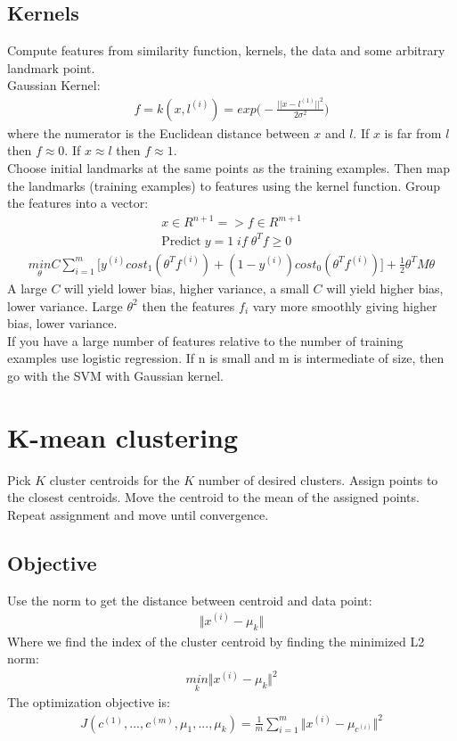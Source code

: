 \documentclass[12pt]{article}
\begin{document}
\begin{&itemize}
\subsection{Kernels}
Compute features from similarity function, kernels, the data and some arbitrary landmark point. \\

Gaussian Kernel:
\begin{align*}
	f = k(x, l^{(i)})=exp\bigg(-\frac{||x-l^{(1)}||^2}{2\sigma^2}\bigg)
\end{align*}
where the numerator is the Euclidean distance between $x$ and $l$. If $x$ is far from $l$ then $f\approx 0$.  If $x\approx l$ then $f\approx 1$. \\ 

Choose initial landmarks at the same points as the training examples. Then map the landmarks (training examples) to features using the kernel function. Group the features into a vector:
\begin{align*}
	x\in R^{n+1} => f\in R^{m+1} \\
	\text{Predict}\; y=1\; if\; \theta^Tf\ge 0
\end{align*} 
\begin{align*}
\underset{\theta}{min}C\sum_{i=1}^{m}\bigg[y^{(i)}cost_1(\theta^Tf^{(i)})+(1-y^{(i)})cost_0(\theta^Tf^{(i)})\bigg] + \frac{1}{2}\theta^TM\theta
\end{align*}
 A large $C$ will yield lower bias, higher variance, a small $C$ will yield higher bias, lower variance. Large $\theta^2$ then the features $f_i$ vary more smoothly giving higher bias, lower variance. \\
 
 If you have a large number of features relative to the number of training examples use logistic regression. If n is small and m is intermediate of size, then go with the SVM with Gaussian kernel.
 
\section{K-mean clustering}
Pick $K$ cluster centroids for the $K$ number of desired clusters. Assign points to the closest centroids. Move the centroid to the mean of the assigned points. Repeat assignment and move until convergence. 

\subsection{Objective}
Use the norm to get the distance between centroid and data point:
\begin{align*}
	\Vert x^{(i)} - \mu_k\Vert
\end{align*}
Where we find the index of the cluster centroid by finding the minimized L2 norm:
\begin{align*}
	\underset{k}{min}\Vert x^{(i)} - \mu_k\Vert^2
\end{align*}
The optimization objective is:
\begin{align*}
J(c^{(1)},...,c^{(m)},\mu_1,...,\mu_k) = \frac{1}{m}\sum_{i=1}^{m}\Vert x^{(i)} - \mu_{c^(i)}\Vert^2
\end{align*}


\end{&itemize}
\end{document}
